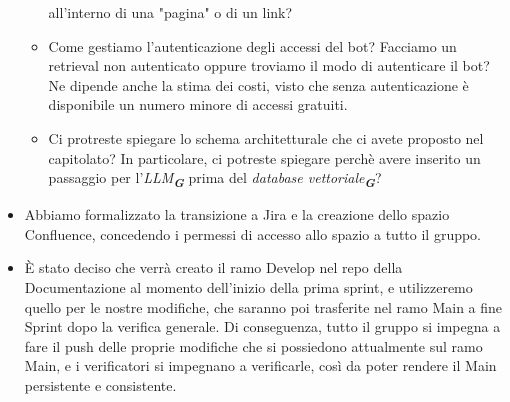 \begin{itemize}
\begin{itemize}
        all'interno di una "pagina" o di un link?
        \item Come gestiamo l'autenticazione degli accessi del bot? Facciamo un retrieval non autenticato oppure troviamo il modo di autenticare il bot?
        Ne dipende anche la stima dei costi, visto che senza autenticazione è disponibile un numero minore di accessi gratuiti.
        \item Ci protreste spiegare lo schema architetturale che ci avete proposto nel capitolato? In particolare, ci potreste spiegare perchè avere 
        inserito un passaggio per l'\emph{LLM}\textsubscript{\textit{\textbf{G}}} prima del \emph{database vettoriale}\textsubscript{\textit{\textbf{G}}}?
    \end{itemize}
    \item Abbiamo formalizzato la transizione a Jira e la creazione dello spazio Confluence, 
    concedendo i permessi di accesso allo spazio a tutto il gruppo.
    \item È stato deciso che verrà creato il ramo Develop nel repo della Documentazione al momento dell'inizio della prima sprint, e utilizzeremo
    quello per le nostre modifiche, che saranno poi trasferite nel ramo Main a fine Sprint dopo la verifica generale. Di conseguenza, tutto il gruppo
    si impegna a fare il push delle proprie modifiche che si possiedono attualmente sul ramo Main, e i verificatori si impegnano a verificarle, 
    così da poter rendere il Main persistente e consistente.
\end{itemize}
